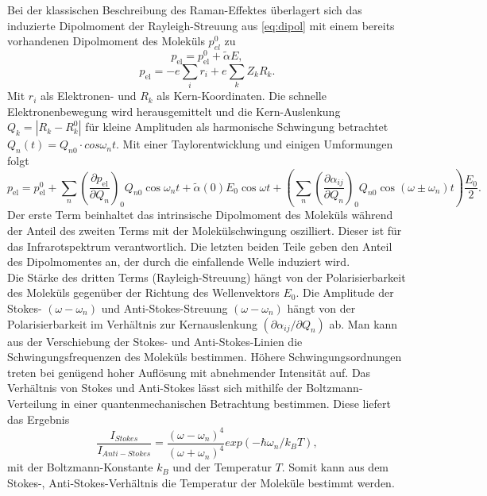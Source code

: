 \documentclass[.../bericht]{subfilies}
\begin{document}
      Bei der klassischen Beschreibung des Raman-Effektes überlagert sich das induzierte Dipolmoment der Rayleigh-Streuung aus \cref{eq:dipol} mit einem bereits vorhandenen Dipolmoment des Moleküls $p_{el}^0$ zu
      \begin{equation*}
        p_\mathrm{el}=p_\mathrm{el}^0+\widetilde{\alpha} E,
      \end{equation*}
      \begin{equation*}
      p_\mathrm{el}=-e\sum_i r_i+e\sum_k Z_k R_k.
      \end{equation*}
      Mit $r_i$ als Elektronen- und $R_k$ als Kern-Koordinaten.
      Die schnelle Elektronenbewegung wird herausgemittelt und die Kern-Auslenkung $Q_k=|R_k-R_k^0|$ für kleine Amplituden als harmonische Schwingung betrachtet $Q_n(t)=Q_{n0}\cdot cos\omega_n t$. Mit einer Taylorentwicklung und einigen Umformungen folgt
      \begin{equation}
        p_\mathrm{el}=p_\mathrm{el}^0+\sum_n (\frac{\partial p_\mathrm{el}}{\partial Q_n})_0 Q_{n0}\cos\omega_n t+\widetilde{\alpha}(0) E_0 \cos\omega t+(\sum_n (\frac{\partial \alpha_{ij}}{\partial Q_n})_0 Q_{n0}\cos(\omega \pm \omega_n)t)\frac{E_0}{2}.
        \label{eq:gesamtdipolmoment}
      \end{equation}
      Der erste Term beinhaltet das intrinsische Dipolmoment des Moleküls während der Anteil des zweiten Terms mit der Molekülschwingung oszilliert. Dieser ist für das Infrarotspektrum verantwortlich. Die letzten beiden Teile geben den Anteil des Dipolmomentes an, der durch die einfallende Welle induziert wird.\\
      Die Stärke des dritten Terms (Rayleigh-Streuung) hängt von der Polarisierbarkeit des Moleküls gegenüber der Richtung des Wellenvektors $E_0$.
      Die Amplitude der Stokes- $(\omega-\omega_n)$ und Anti-Stokes-Streuung $(\omega-\omega_n)$ hängt von der Polarisierbarkeit im Verhältnis zur Kernauslenkung $(\partial \alpha_{ij} / \partial Q_n)$ ab. Man kann aus der Verschiebung der Stokes- und Anti-Stokes-Linien die Schwingungsfrequenzen des Moleküls bestimmen. Höhere Schwingungsordnungen treten bei genügend hoher Auflösung mit abnehmender Intensität auf. Das Verhältnis von Stokes und Anti-Stokes lässt sich mithilfe der Boltzmann-Verteilung in einer quantenmechanischen Betrachtung bestimmen. Diese liefert das Ergebnis
      \begin{equation}
        \frac{I_{Stokes}}{I_{Anti-Stokes}}=\frac{(\omega-\omega_n)^4}{(\omega+\omega_n)^4}exp(-\hbar \omega_n/ k_B T),
        \label{eq:stokesvergleich}
      \end{equation}
      mit der Boltzmann-Konstante $k_B$ und der Temperatur $T$. Somit kann aus dem Stokes-, Anti-Stokes-Verhältnis die Temperatur der Moleküle bestimmt werden.
\end{document}
